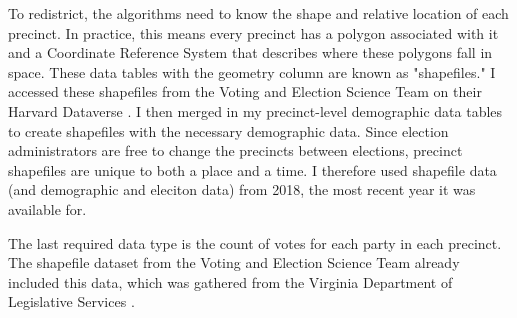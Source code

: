 To redistrict, the algorithms need to know the shape and relative location of each precinct. In practice, this means every precinct has a polygon associated with it and a Coordinate Reference System that describes where these polygons fall in space. These data tables with the geometry column are known as "shapefiles." I accessed these shapefiles from the Voting and Election Science Team on their Harvard Dataverse \parencite{votingandelectionscienceteam2019c}. I then merged in my precinct-level demographic data tables to create shapefiles with the necessary demographic data. Since election administrators are free to change the precincts between elections, precinct shapefiles are unique to both a place and a time. I therefore used shapefile data (and demographic and eleciton data) from 2018, the most recent year it was available for.

The last required data type is the count of votes for each party in each precinct. The shapefile dataset from the Voting and Election Science Team already included this data, which was gathered from the Virginia Department of Legislative Services \parencite{votingandelectionscienceteam2019c}.